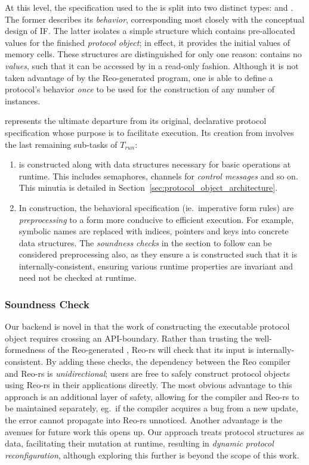At this level, the specification used to  the  is split into two distinct types:  and . The former describes its \textit{behavior}, corresponding most closely with the conceptual design of IF. The latter isolates a simple structure which contains pre-allocated values for the finished \textit{protocol object}; in effect, it provides the initial values of memory cells. These structures are distinguished for only one reason:  contains no \textit{values}, such that it can be accessed by  in a read-only fashion. Although it is not taken advantage of by the Reo-generated program, one is able to define a protocol's behavior \textit{once} to be used for the construction of any number of  instances.

 represents the ultimate departure from its original, declarative protocol specification whose purpose is to facilitate execution. Its creation from  involves the last remaining sub-tasks of $T_{run}$:
\begin{enumerate}
	\item {} is constructed along with data structures necessary for basic operations at runtime. This includes semaphores, channels for \textit{control messages} and so on. This minutia is detailed in Section~\ref{sec:protocol_object_architecture}.
	
	\item In construction, the behavioral specification (ie.\ imperative form rules) are \textit{preprocessing}  to a form more conducive to efficient execution. For example, symbolic names are replaced with indices, pointers and keys into concrete data structures. The \textit{soundness checks} in the section to follow can be considered preprocessing also, as they ensure a  is constructed such that it is internally-consistent, ensuring various runtime properties are invariant and need not be checked at runtime.
\end{enumerate}


\subsubsection{Soundness Check}
Our backend is novel in that the work of constructing the executable protocol object requires crossing an API-boundary. Rather than trusting the well-formedness of the Reo-generated , Reo-rs will check that its input is internally-consistent. By adding these checks, the dependency between the Reo compiler and Reo-rs is \textit{unidirectional}; users are free to safely construct protocol objects using Reo-rs in their applications directly. The most obvious advantage to this approach is an additional layer of safety, allowing for the compiler and Reo-rs to be maintained separately, eg.\ if the compiler acquires a bug from a new update, the error cannot propagate into Reo-rs unnoticed. Another advantage is the avenues for future work this opens up. Our approach treats protocol structures as data, facilitating their mutation at runtime, resulting in \textit{dynamic protocol reconfiguration}, although exploring this further is beyond the scope of this work.

